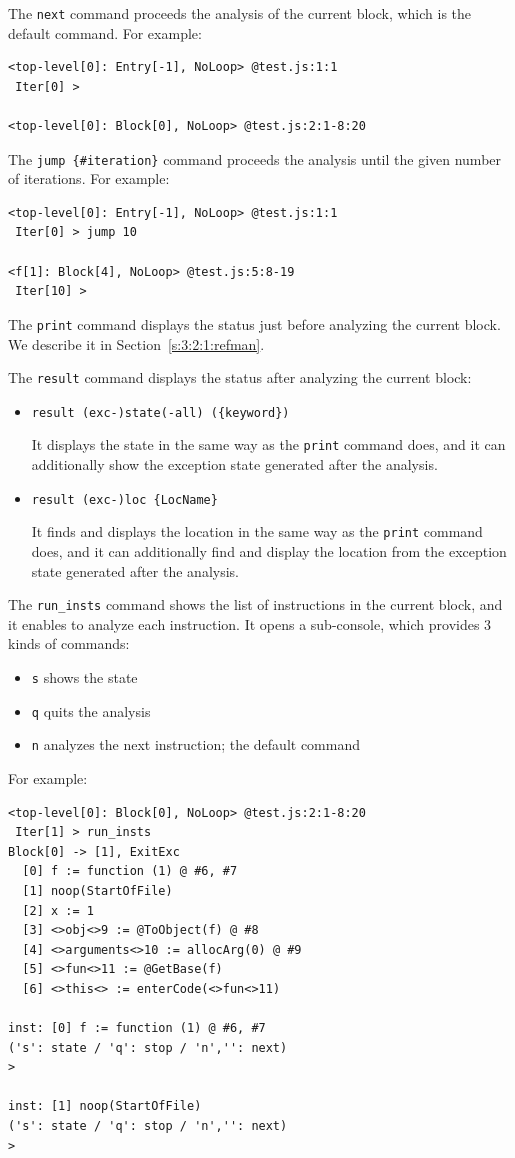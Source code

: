 \medskip
The \verb!next! command proceeds the analysis of the current block,
which is the default command.  For example:
{\small
\begin{verbatim}
<top-level[0]: Entry[-1], NoLoop> @test.js:1:1
 Iter[0] >

<top-level[0]: Block[0], NoLoop> @test.js:2:1-8:20
\end{verbatim}
}

\medskip
The \verb!jump {#iteration}! command proceeds the analysis until the given
number of iterations.  For example:
{\small
\begin{verbatim}
<top-level[0]: Entry[-1], NoLoop> @test.js:1:1
 Iter[0] > jump 10

<f[1]: Block[4], NoLoop> @test.js:5:8-19
 Iter[10] >
\end{verbatim}
}

\medskip
The \verb!print! command displays the status just before
analyzing the current block.  We describe it in Section~\ref{s:3:2:1:refman}.

\medskip
The \verb!result! command displays the status after analyzing
the current block:
\begin{itemize}
\item \verb!result (exc-)state(-all) ({keyword})!

It displays the state in the same way as the \verb!print! command does,
and it can additionally show the exception state generated after the analysis.
\item \verb!result (exc-)loc {LocName}!

It finds and displays the location in the same way as the \verb!print! command does,
and it can additionally find and display the location from
the exception state generated after the analysis.
\end{itemize}

\medskip
The \verb!run_insts! command shows the list of instructions in the current block,
and it enables to analyze each instruction.  It opens a sub-console, which provides 3 kinds
of commands:
\begin{itemize}
\itemsep-.1em
\item \verb!s! shows the state
\item \verb!q! quits the analysis
\item \verb!n! analyzes the next instruction; the default command
\end{itemize}
For example:
{\small
\begin{verbatim}
<top-level[0]: Block[0], NoLoop> @test.js:2:1-8:20
 Iter[1] > run_insts
Block[0] -> [1], ExitExc
  [0] f := function (1) @ #6, #7
  [1] noop(StartOfFile)
  [2] x := 1
  [3] <>obj<>9 := @ToObject(f) @ #8
  [4] <>arguments<>10 := allocArg(0) @ #9
  [5] <>fun<>11 := @GetBase(f)
  [6] <>this<> := enterCode(<>fun<>11)

inst: [0] f := function (1) @ #6, #7
('s': state / 'q': stop / 'n','': next)
>

inst: [1] noop(StartOfFile)
('s': state / 'q': stop / 'n','': next)
>
\end{verbatim}
}

